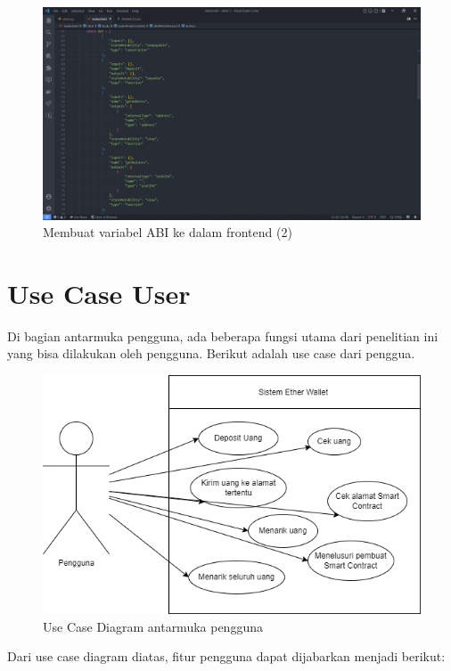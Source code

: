 \begin{figure}[htp]
		\centering
		\includegraphics[scale=0.2]{gambar/bab3/front/2.png}
		\caption{Membuat variabel ABI ke dalam frontend (2)}
		\label{fig:abiready2}
	\end{figure}
\newpage
\section{Use Case User}
\label{sec:usecaseuser}

Di bagian antarmuka pengguna, ada beberapa fungsi utama dari penelitian ini yang bisa dilakukan oleh pengguna. Berikut adalah use case dari penggua.
\begin{figure}[htp]
	\centering
	\includegraphics[scale=0.45]{gambar/use-case-diagram-sistem.png}
	\caption{Use Case Diagram antarmuka pengguna}
	\label{fig:usecasefrontend}
\end{figure}

Dari use case diagram diatas, fitur pengguna dapat dijabarkan menjadi berikut:

